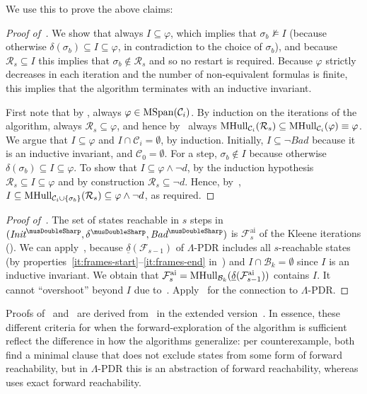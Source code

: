 \documentclass[acmsmall,screen]{acmart}
\newcommand{\Init}{{\textit{Init}}}
\newcommand{\Bad}{\textit{Bad}}
\newcommand{\tr}{\delta}
\newcommand{\Frame}{\mathcal{F}}
\newcommand{\Frameai}{\mathcal{F}^{\text{ai}}}
\newcommand{\set}[1]{\{{#1}\}}
\newcommand{\reflextr}[1]{\underline{#1}}
\newcommand{\postimage}[2]{{\reflextr{#1}}({#2})}
\newcommand{\bkwrch}[1]{\mathcal{B}_{#1}}
\newcommand{\mspan}[1]{{\rm MSpan}({#1})}
\newcommand{\mhull}[2]{{\rm MHull}_{#2}({#1})}
\newcommand{\absr}[1]{{#1}^{\musDoubleSharp}}
\begin{document}
\iflong
We use this to prove the above claims:
\begin{proof}[Proof of~]
We show that always $I \subseteq \varphi$, which implies that $\sigma_b \not\models I$ (because otherwise $\tr(\sigma_b) \subseteq I \subseteq \varphi$, in contradiction to the choice of $\sigma_b$), and because $\mathcal{R}_s \subseteq I$ this implies that $\sigma_b \not\in \mathcal{R}_s$ and so no restart is required. Because $\varphi$ strictly decreases in each iteration and the number of non-equivalent formulas is finite, this implies that the algorithm terminates with an inductive invariant.

First note that by , always $\varphi \in \mspan{\mathcal{C}_i}$. By induction on the iterations of the algorithm, always $\mathcal{R}_s \subseteq \varphi$, and hence by~ always $\mhull{\mathcal{R}_s}{\mathcal{C}_i} \subseteq \mhull{\varphi}{\mathcal{C}_i} \equiv \varphi$.
We argue that $I \subseteq \varphi$ and $I \cap \mathcal{C}_i = \emptyset$, by induction.
Initially, $I \subseteq \neg \Bad$ because it is an inductive invariant, and $\mathcal{C}_0 = \emptyset$.
For a step, $\sigma_b \not\in I$ because otherwise $\tr(\sigma_b) \subseteq I \subseteq \varphi$.
To show that $I \subseteq \varphi \land \neg d$, by the induction hypothesis $\mathcal{R}_s \subseteq I \subseteq \varphi$ and by construction $\mathcal{R}_s \subseteq \neg d$. Hence, by~, $I \subseteq \mhull{\mathcal{R}_s}{\mathcal{C}_i \cup \set{\sigma_b}} \subseteq \varphi \land \neg d$, as required.
%
\end{proof}
\begin{proof}[Proof of~]
The set of states reachable in $s$ steps in $(\absr{\Init},\absr{\tr},\absr{\Bad})$ is $\Frameai_s$ of the Kleene iterations ().
We can apply~, because $\postimage{\tr}{\Frame_{s-1}}$ of $\Lambda$-PDR includes all $s$-reachable states (by properties~\ref{it:frames-start}--\ref{it:frames-end} in~) and $I \cap \bkwrch{k} = \emptyset$ since $I$ is an inductive invariant. We obtain that $\Frameai_s = \mhull{\postimage{\tr}{\Frameai_{s-1}}}{\bkwrch{k}}$ contains $I$. It cannot ``overshoot'' beyond $I$ due to~.
Apply~ for the connection to $\Lambda$-PDR.
\end{proof}
\else
Proofs of~ and~ are derived from~ in the extended version~\cite{extendedVersion}. %
\fi
%
In essence, these different criteria for when the forward-exploration of the algorithm is sufficient reflect the difference in how the algorithms generalize: per counterexample, both find a minimal clause that does not exclude states from some form of forward reachability, but in $\Lambda$-PDR this is an abstraction of forward reachability, whereas
%
uses exact forward reachability.
\end{document}
